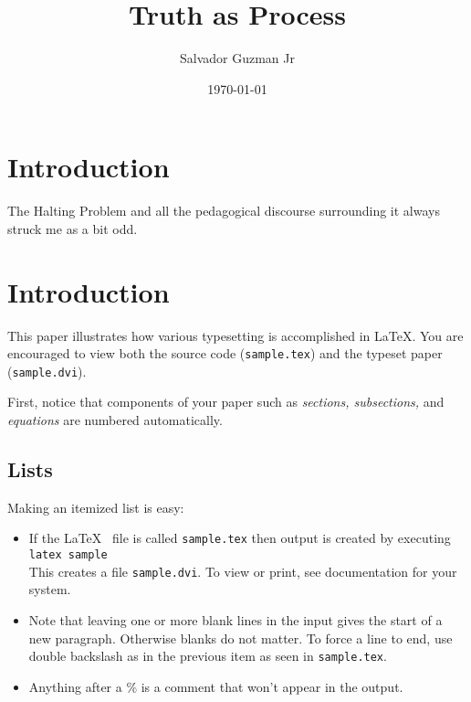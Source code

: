 \documentclass{article}
\begin{document}
	
	\title{Truth as Process}   %
	\author{Salvador Guzman Jr}
	\date{\today}
	\maketitle
	\tableofcontents
	
	\section{Introduction}
	
	The Halting Problem and all the pedagogical discourse surrounding it always struck me as a bit odd.
	
	\section{Introduction}
	
	This paper illustrates how various typesetting is accomplished in \LaTeX.
	You are encouraged to view both the source code ({\tt sample.tex}) 
	and the typeset paper ({\tt sample.dvi}). 
	
	First, notice that components of your paper such as {\it sections, subsections,} and 
	{\it equations} are numbered automatically.  
	
	\subsection{Lists}
	Making an itemized list is easy:
	\begin{itemize}
		\item If the \LaTeX~ file is called {\tt sample.tex} then output is created by
		executing \\
		{\tt latex sample} \\
		This creates a file {\tt sample.dvi}.
		To view or print, see documentation for your system.
		\item Note that leaving one or more blank lines
		in the input
		gives the start of a new paragraph.  Otherwise blanks
		do not   matter.  %
		To force a line to end, use double backslash as in the previous item as seen in {\tt sample.tex}.
		
		\item Anything after a \% is a comment that won't appear in the output.
	\end{itemize}
	
\end{document}
